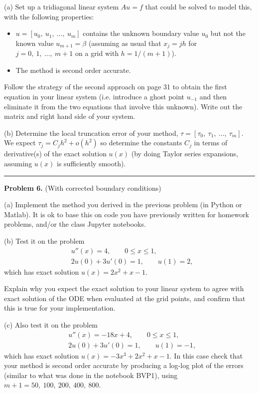 \documentclass[10pt]{article}
\begin{document}
\newpage
(a) Set up a tridiagonal linear system $Au=f$ that could be solved to
model this, with the following properties:
\begin{itemize}
\item $u = [u_0,~u_1,~\ldots,~u_m]$ contains the unknown boundary value $u_0$ 
but not the known value $u_{m+1} = \beta$ (assuming as usual that $x_j = jh$
for $j=0,~1,~\ldots,~m+1$ on a grid with $h=1/(m+1)$).
\item The method is second order accurate. 
\end{itemize}
Follow the strategy of the second approach on page 31 to obtain the first
equation in your linear system (i.e. introduce a ghost point $u_{-1}$ and 
then eliminate it from the two equations that involve this unknown).
Write out the matrix and right hand side of your system.

(b) Determine the local truncation error of your method, 
$\tau = [\tau_0,~\tau_1,~\ldots,~\tau_m]$.  We expect $\tau_j = C_jh^2 + o(h^2)$
so determine the constants $C_j$ in terms of derivative(s) of the exact solution
$u(x)$ (by doing Taylor series expansions, assuming $u(x)$ is sufficiently
smooth).





\vskip 1cm
\hrule
{\bf Problem 6.} (With corrected boundary conditions)

(a) Implement the method you derived in the previous problem (in Python or Matlab).
It is ok to base this on code you have previously written for homework problems,
and/or the class Jupyter notebooks.

(b) Test it on the problem
\begin{align*}
&u''(x) = 4, \qquad 0\leq x \leq 1,\\
&2u(0) + 3u'(0) = 1, \qquad u(1)=2,
\end{align*}
which has exact solution $u(x) = 2x^2 + x - 1$.

Explain why you expect the exact solution to your linear system to agree with
exact solution of the ODE when evaluated at the grid points, and confirm that
this is true for your implementation.

(c) Also test it on the problem
\begin{align*}
&u''(x) = -18x + 4, \qquad 0\leq x \leq 1,\\
&2u(0) + 3u'(0) = 1, \qquad u(1)=-1,
\end{align*}
which has exact solution $u(x) = -3x^3 + 2x^2 + x - 1$.
In this case check that your method is second order accurate by producing
a log-log plot of the errors (similar to what was done in the notebook BVP1),
using $m+1 = 50,~100,~200,~400,~800$.





\end{document}
